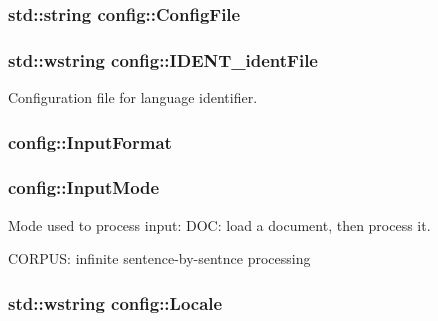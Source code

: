 \subsubsection[{Config\+File}]{\setlength{\rightskip}{0pt plus 5cm}std\+::string config\+::\+Config\+File}\label{classconfig_a24ba112bf45f600af2f79352b1c26646}
\hypertarget{classconfig_a66b67d42d16146ebcc7f7bc355c5b60c}{}
\subsubsection[{I\+D\+E\+N\+T\+\_\+ident\+File}]{\setlength{\rightskip}{0pt plus 5cm}std\+::wstring config\+::\+I\+D\+E\+N\+T\+\_\+ident\+File}\label{classconfig_a66b67d42d16146ebcc7f7bc355c5b60c}


Configuration file for language identifier. 

\hypertarget{classconfig_ab66ebbcc7f73de39355cdf724cd644e6}{}
\subsubsection[{Input\+Format}]{ config\+::\+Input\+Format}\label{classconfig_ab66ebbcc7f73de39355cdf724cd644e6}
\hypertarget{classconfig_a081f4b86bc4315514b3693da987da11f}{}
\subsubsection[{Input\+Mode}]{ config\+::\+Input\+Mode}\label{classconfig_a081f4b86bc4315514b3693da987da11f}


Mode used to process input\+: D\+O\+C\+: load a document, then process it. 

C\+O\+R\+P\+U\+S\+: infinite sentence-\/by-\/sentnce processing \hypertarget{classconfig_a850a92a12eacd1bfee3f917792463b3f}{}
\subsubsection[{Locale}]{\setlength{\rightskip}{0pt plus 5cm}std\+::wstring config\+::\+Locale}\label{classconfig_a850a92a12eacd1bfee3f917792463b3f}


